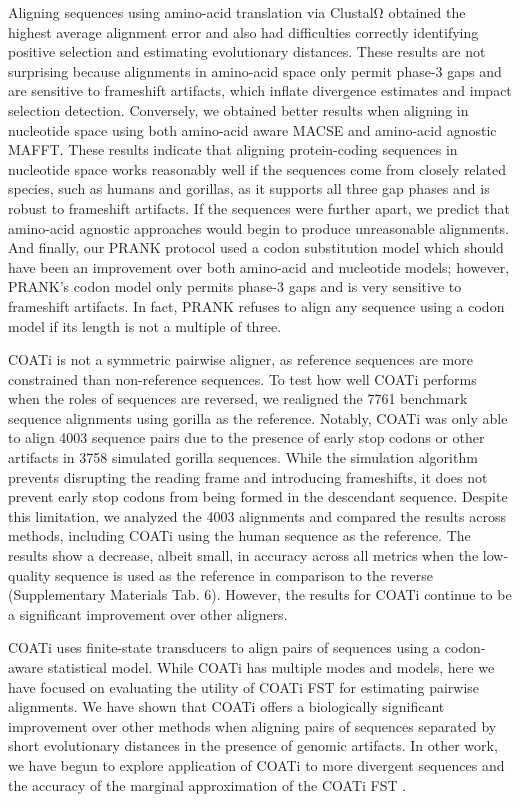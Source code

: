 \documentclass[12pt,letterpaper]{article}
\begin{document}
Aligning sequences using amino-acid translation via ClustalΩ obtained the highest average alignment error and also had difficulties correctly identifying positive selection and estimating evolutionary distances. These results are not surprising because alignments in amino-acid space only permit phase-3 gaps and are sensitive to frameshift artifacts, which inflate divergence estimates and impact selection detection. Conversely, we obtained better results when aligning in nucleotide space using both amino-acid aware MACSE and amino-acid agnostic MAFFT. These results indicate that aligning protein-coding sequences in nucleotide space works reasonably well if the sequences come from closely related species, such as humans and gorillas, as it supports all three gap phases and is robust to frameshift artifacts. If the sequences were further apart, we predict that amino-acid agnostic approaches would begin to produce unreasonable alignments. And finally, our PRANK protocol used a codon substitution model which should have been an improvement over both amino-acid and nucleotide models; however, PRANK's codon model only permits phase-3 gaps and is very sensitive to frameshift artifacts. In fact, PRANK refuses to align any sequence using a codon model if its length is not a multiple of three.



COATi is not a symmetric pairwise aligner, as reference sequences are more constrained than non-reference sequences. To test how well COATi performs when the roles of sequences are reversed, we realigned the 7761 benchmark sequence alignments using gorilla as the reference. Notably, COATi was only able to align 4003 sequence pairs due to the presence of early stop codons or other artifacts in 3758 simulated gorilla sequences. While the simulation algorithm prevents disrupting the reading frame and introducing frameshifts, it does not prevent early stop codons from being formed in the descendant sequence. Despite this limitation, we analyzed the 4003 alignments and compared the results across methods, including COATi using the human sequence as the reference. The results show a decrease, albeit small, in accuracy across all metrics when the low-quality sequence is used as the reference in comparison to the reverse (Supplementary Materials Tab. 6). However, the results for COATi continue to be a significant improvement over other aligners.

COATi uses finite-state transducers to align pairs of sequences using a codon-aware statistical model. While COATi has multiple modes and models, here we have focused on evaluating the utility of COATi FST for estimating pairwise alignments. We have shown that COATi offers a biologically significant improvement over other methods when aligning pairs of sequences separated by short evolutionary distances in the presence of genomic artifacts. In other work, we have begun to explore application of COATi to more divergent sequences and the accuracy of the marginal approximation of the COATi FST \citep{garcia2023dissertation}. 
\end{document}

